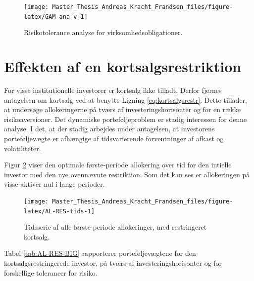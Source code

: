 \documentclass[
  a4paper,
  oneside]{memoir}
\begin{document}
\begin{figure}[H]

{\centering \texttt{[image: Master\_Thesis\_Andreas\_Kracht\_Frandsen\_files/figure-latex/GAM-ana-v-1]} 

}

\caption{Risikotolerance analyse for virksomhedsobligationer.}\label{fig:GAM-ana-v}
\end{figure}

\hypertarget{effekten-af-en-kortsalgsrestriktion}{%
\section{Effekten af en kortsalgsrestriktion}\label{effekten-af-en-kortsalgsrestriktion}}

For visse institutionelle investorer er kortsalg ikke tilladt. Derfor fjernes antagelsen om kortsalg ved at benytte Ligning \eqref{eq:kortsalgsrestr}. Dette tillader, at undersøge allokeringerne på tværs af investeringshorisonter og for en række risikoaversioner. Det dynamiske porteføljeproblem er stadig interessen for denne analyse. I det, at der stadig arbejdes under antagelsen, at investorens porteføljevægte er afhængige af tidsvarierende forventninger af afkast og volatiliteter.

Figur \ref{fig:AL-RES-tids} viser den optimale første-periode allokering over tid for den intielle investor med den nye ovennævnte restriktion. Som det kan ses er allokeringen på visse aktiver nul i lange perioder.

\begin{figure}[H]

{\centering \texttt{[image: Master\_Thesis\_Andreas\_Kracht\_Frandsen\_files/figure-latex/AL-RES-tids-1]} 

}

\caption{Tidsserie af alle første-periode allokeringer, med restringeret kortsalg.}\label{fig:AL-RES-tids}
\end{figure}

Tabel \ref{tab:AL-RES-BIG} rapporterer porteføljevægtene for den kortsalgsrestringerede investor, på tværs af investeringshorisonter og for forskellige tolerancer for risiko.
\end{document}
